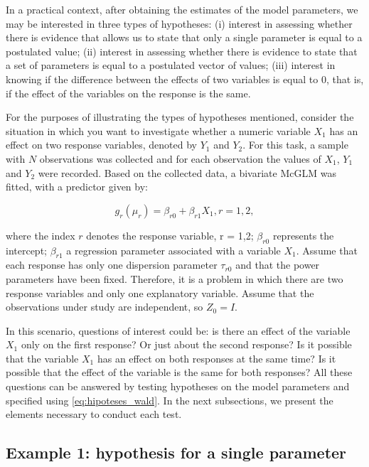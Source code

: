 \documentclass[AMA,STIX1COL]{WileyNJD-v2}
\begin{document}
In a practical context, after obtaining the estimates of the model parameters, we may be interested in three types of hypotheses: (i) interest in assessing whether there is evidence that allows us to state that only a single parameter is equal to a postulated value; (ii) interest in assessing whether there is evidence to state that a set of parameters is equal to a postulated vector of values; (iii) interest in knowing if the difference between the effects of two variables is equal to 0, that is, if the effect of the variables on the response is the same.

For the purposes of illustrating the types of hypotheses mentioned, consider the situation in which you want to investigate whether a numeric variable $X_1$ has an effect on two response variables, denoted by $Y_1$ and $Y_2$. For this task, a sample with $N$ observations was collected and for each observation the values of $X_1$, $Y_1$ and $Y_2$ were recorded. Based on the collected data, a bivariate McGLM was fitted, with a predictor given by:

\begin{equation}
\label{eq:pred_ex}
g_r(\mu_r) = \beta_{r0} + \beta_{r1} X_1, r=1,2,
\end{equation}

\noindent where the index $r$ denotes the response variable, r = 1,2; $\beta_{r0}$ represents the intercept; $\beta_{r1}$ a regression parameter associated with a variable $X_1$. Assume that each response has only one dispersion parameter $\tau_{r0}$ and that the power parameters have been fixed. Therefore, it is a problem in which there are two response variables and only one explanatory variable. Assume that the observations under study are independent, so $Z_0 = I$. 

In this scenario, questions of interest could be: is there an effect of the variable $X_1$ only on the first response? Or just about the second response? Is it possible that the variable $X_1$ has an effect on both responses at the same time? Is it possible that the effect of the variable is the same for both responses? All these questions can be answered by testing hypotheses on the model parameters and specified using \autoref{eq:hipoteses_wald}. In the next subsections, we present the elements necessary to conduct each test.

\subsection{Example 1: hypothesis for a single parameter}
\end{document}
